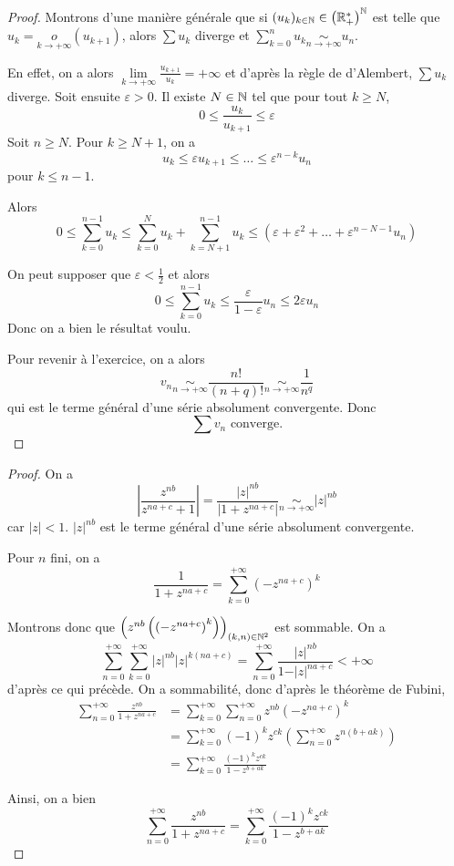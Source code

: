 \begin{proof}
	Montrons d'une manière générale que si $(u_{k})_{k\in\mathbb{N}}\in\left(\mathbb{R}_{+}^{*}\right)^{\mathbb{N}}$ est telle que $u_{k}=\underset{k\to+\infty}{o}(u_{k+1})$, alors $\sum u_{k}$ diverge et $\sum_{k=0}^{n}u_{k}\underset{n\to+\infty}{\sim}u_{n}$.

	En effet, on a alors $\lim\limits_{k\to+\infty}\frac{u_{k+1}}{u_{k}}=+\infty$ et d'après la règle de d'Alembert, $\sum u_{k}$ diverge. Soit ensuite $\varepsilon>0$. Il existe $N\in\mathbb{N}$ tel que pour tout $k\geqslant N$, 
	$$0\leqslant \frac{u_{k}}{u_{k+1}}\leqslant\varepsilon$$
	Soit $n\geqslant N$. Pour $k\geqslant N+1$, on a 
	$$u_{k}\leqslant \varepsilon u_{k+1}\leqslant\dots\leqslant \varepsilon^{n-k}u_{n}$$
	pour $k\leqslant n-1$.

	Alors 
	$$0\leqslant\sum_{k=0}^{n-1}u_{k}\leqslant\sum_{k=0}^{N}u_{k}+\sum_{k=N+1}^{n-1}u_{k}\leqslant\left(\varepsilon+\varepsilon^{2}+\dots+\varepsilon^{n-N-1}u_{n}\right)$$

	On peut supposer que $\varepsilon<\frac{1}{2}$ et alors 
	$$0\leqslant\sum_{k=0}^{n-1}u_{k}\leqslant\frac{\varepsilon}{1-\varepsilon}u_{n}\leqslant2\varepsilon u_{n}$$
	Donc on a bien le résultat voulu.

	Pour revenir à l'exercice, on a alors 
	$$v_{n}\underset{n\to+\infty}{\sim}\frac{n!}{(n+q)!}\underset{n\to+\infty}{\sim}\frac{1}{n^{q}}$$
	qui est le terme général d'une série absolument convergente.
	Donc 
	$$\boxed{\sum v_{n}\text{ converge.}}$$
\end{proof}

\begin{proof}
	On a 
	$$\left\vert\frac{z^{nb}}{z^{na+c}+1}\right\vert=\frac{\left\vert z\right\vert^{nb}}{\left\vert1+z^{na+c}\right\vert}\underset{n\to+\infty}{\sim}\left\vert z\right\vert^{nb}$$
	car $\vert z\vert<1$. $\vert z\vert^{nb}$ est le terme général d'une série absolument convergente.

	Pour $n$ fini, on a 
	$$\frac{1}{1+z^{na+c}}=\sum_{k=0}^{+\infty}(-z^{na+c})^{k}$$

	Montrons donc que $\left(z^{nb}\left(\left(-z^{na+c}\right)^{k}\right)\right)_{(k,n)\in\mathbb{N}^{2}}$ est sommable. On a 
	$$\sum_{n=0}^{+\infty}\sum_{k=0}^{+\infty}\vert z\vert^{nb}\vert z\vert^{k(na+c)}=\sum_{n=0}^{+\infty}\frac{\vert z\vert^{nb}}{1-\vert z\vert^{na+c}}<+\infty$$
	d'après ce qui précède. On a sommabilité, donc d'après le théorème de Fubini,
	\begin{align*}
		\sum_{n=0}^{+\infty}\frac{z^{nb}}{1+z^{na+c}}
		&=\sum_{k=0}^{+\infty}\sum_{n=0}^{+\infty}z^{nb}(-z^{na+c})^{k}\\
		&=\sum_{k=0}^{+\infty}(-1)^{k}z^{ck}\left(\sum_{n=0}^{+\infty}z^{n(b+ak)}\right)\\
		&=\sum_{k=0}^{+\infty}\frac{(-1)^{k}z^{ck}}{1-z^{b+ak}}
	\end{align*}

	Ainsi, on a bien 
	$$\boxed{\sum_{n=0}^{+\infty}\frac{z^{nb}}{1+z^{na+c}}=\sum_{k=0}^{+\infty}\frac{(-1)^{k}z^{ck}}{1-z^{b+ak}}}$$
\end{proof}

